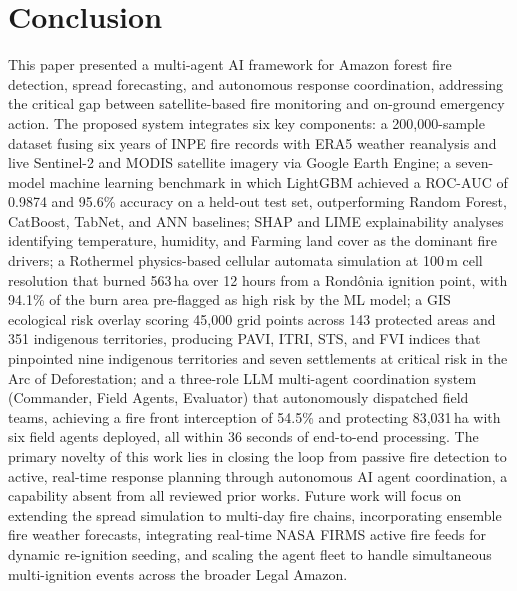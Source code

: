 \documentclass[12pt,a4paper]{article}
\begin{document}
\section{Conclusion}

This paper presented a multi-agent AI framework for Amazon forest fire detection, spread forecasting, and autonomous response coordination, addressing the critical gap between satellite-based fire monitoring and on-ground emergency action. The proposed system integrates six key components: a 200,000-sample dataset fusing six years of INPE fire records with ERA5 weather reanalysis and live Sentinel-2 and MODIS satellite imagery via Google Earth Engine; a seven-model machine learning benchmark in which LightGBM achieved a ROC-AUC of 0.9874 and 95.6\% accuracy on a held-out test set, outperforming Random Forest, CatBoost, TabNet, and ANN baselines; SHAP and LIME explainability analyses identifying temperature, humidity, and Farming land cover as the dominant fire drivers; a Rothermel physics-based cellular automata simulation at 100\,m cell resolution that burned 563\,ha over 12 hours from a Rond\^{o}nia ignition point, with 94.1\% of the burn area pre-flagged as high risk by the ML model; a GIS ecological risk overlay scoring 45,000 grid points across 143 protected areas and 351 indigenous territories, producing PAVI, ITRI, STS, and FVI indices that pinpointed nine indigenous territories and seven settlements at critical risk in the Arc of Deforestation; and a three-role LLM multi-agent coordination system (Commander, Field Agents, Evaluator) that autonomously dispatched field teams, achieving a fire front interception of 54.5\% and protecting 83,031\,ha with six field agents deployed, all within 36 seconds of end-to-end processing. The primary novelty of this work lies in closing the loop from passive fire detection to active, real-time response planning through autonomous AI agent coordination, a capability absent from all reviewed prior works. Future work will focus on extending the spread simulation to multi-day fire chains, incorporating ensemble fire weather forecasts, integrating real-time NASA FIRMS active fire feeds for dynamic re-ignition seeding, and scaling the agent fleet to handle simultaneous multi-ignition events across the broader Legal Amazon.
\end{document}
